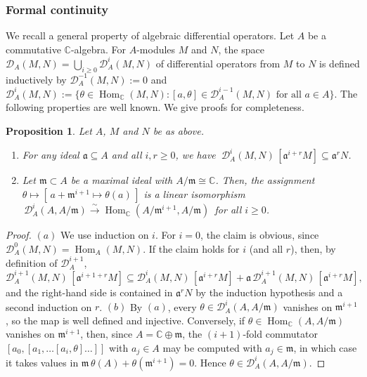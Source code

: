 \documentclass[11pt,reqno]{amsart}
\theoremstyle{plain}
\newtheorem{proposition}{Proposition}[section]
\theoremstyle{definition}
\theoremstyle{remark}
\numberwithin{equation}{section}
\newcommand{\cD}{\mathcal{D}}
\newcommand{\C}{\mathbb{C}}
\newcommand{\fm}{\mathfrak{m}}
\DeclareMathOperator{\Hom}{Hom}
\begin{document}
\subsubsection*{Formal continuity}
We recall a general property of algebraic differential operators. Let $A$ be a commutative
$\C$-algebra. For $A$-modules $M$ and $N$, the space $\cD_A(M,N) = \bigcup_{i \ge 0} \cD^i_A(M,N)$
of differential operators from $M$ to $N$ is defined inductively by $\cD^{-1}_A(M,N) := 0$ and
$\cD^i_A(M,N) := \{ \theta \in \Hom_{\C}(M,N) : [a, \theta] \in \cD^{i-1}_A(M,N) \text{ for all }
a \in A \}$. The following properties are well known. We give  proofs for completeness.

\begin{proposition}
\label{P2.1}
Let $A$, $M$ and $N$ be as above.
\begin{enumerate}
\item[$(a)$] For any ideal $\mathfrak{a} \subseteq A$ and all $i, r \ge 0$, we have
$\ \cD^i_A(M,N)\,[\mathfrak{a}^{i+r} M] \subseteq \mathfrak{a}^r N$.
\item[$(b)$] Let $\fm \subset A$ be a maximal ideal with $A/\fm \cong \C$. Then, 
the assignment $\theta \mapsto [\, a + \fm^{i+1} \mapsto \theta(a)\,]$ is a linear isomorphism
$\, \cD^i_A(A, A/\fm) \stackrel{\sim}{\to} \Hom_{\C}(A/\fm^{i+1}, A/\fm)\,$ for all $i \ge 0$.
\end{enumerate}
\end{proposition}

\begin{proof}
$(a)$ We use induction on $i$. For $i = 0$, the claim is obvious, since $\cD^0_A(M,N) =
\Hom_A(M,N)$. If the claim holds for $i$ (and all $r$), then, by definition of $\cD^{i+1}_A$,
\[
  \cD^{i+1}_A(M,N)\,[\mathfrak{a}^{i+1+r} M] \subseteq \cD^{i}_A(M,N)\,[\mathfrak{a}^{i+r} M] +
  \mathfrak{a}\, \cD^{i+1}_A(M,N)\,[\mathfrak{a}^{i+r} M] ,
\]
and the right-hand side is contained in $\mathfrak{a}^r N$ by the induction hypothesis and a
second induction on $r$. $(b)$ By $(a)$, every $\theta \in \cD^i_A(A, A/\fm)$ vanishes on
$\fm^{i+1}$, so the map is well defined and injective. Conversely, if $\theta \in \Hom_{\C}(A,
A/\fm)$ vanishes on $\fm^{i+1}$, then, since $A = \C \oplus \fm$, the $(i+1)$-fold commutator
$[a_0, [a_1, \ldots [a_i, \theta] \ldots ]]$ with $a_j \in A$ may be computed with $a_j \in \fm$,
in which case it takes values in $\fm\, \theta(A) + \theta(\fm^{i+1}) = 0$. Hence
$\theta \in \cD^i_A(A, A/\fm)$.
\end{proof}
\end{document}
